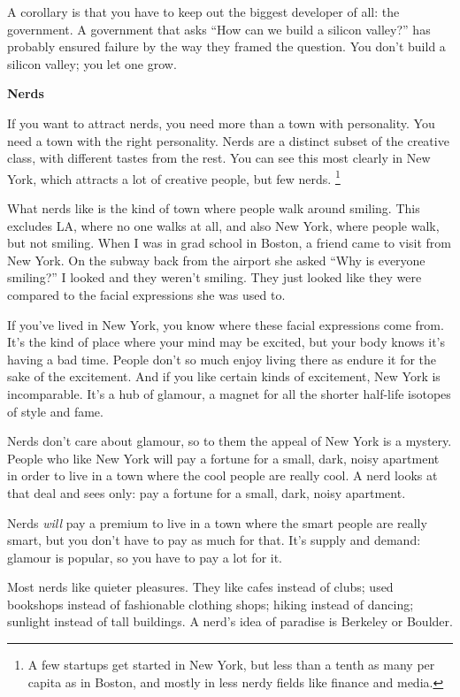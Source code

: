 A corollary is that you have to keep out the biggest developer of all:
the government. A government that asks ``How can we build a silicon
valley?'' has probably ensured failure by the way they framed the
question. You don't build a silicon valley; you let one grow.

\textbf{Nerds}

If you want to attract nerds, you need more than a town with
personality. You need a town with the right personality. Nerds are a
distinct subset of the creative class, with different tastes from the
rest. You can see this most clearly in New York, which attracts a lot of
creative people, but few nerds. \footnote{A few startups get started in New York, but less than a tenth as
many per capita as in Boston, and mostly in less nerdy fields like
finance and media.}

What nerds like is the kind of town where people walk around smiling.
This excludes LA, where no one walks at all, and also New York, where
people walk, but not smiling. When I was in grad school in Boston, a
friend came to visit from New York. On the subway back from the airport
she asked ``Why is everyone smiling?'' I looked and they weren't
smiling. They just looked like they were compared to the facial
expressions she was used to.

If you've lived in New York, you know where these facial expressions
come from. It's the kind of place where your mind may be excited, but
your body knows it's having a bad time. People don't so much enjoy
living there as endure it for the sake of the excitement. And if you
like certain kinds of excitement, New York is incomparable. It's a hub
of glamour, a magnet for all the shorter half-life isotopes of style and
fame.

Nerds don't care about glamour, so to them the appeal of New York is a
mystery. People who like New York will pay a fortune for a small, dark,
noisy apartment in order to live in a town where the cool people are
really cool. A nerd looks at that deal and sees only: pay a fortune for
a small, dark, noisy apartment.

Nerds \emph{will} pay a premium to live in a town where the smart people
are really smart, but you don't have to pay as much for that. It's
supply and demand: glamour is popular, so you have to pay a lot for it.

Most nerds like quieter pleasures. They like cafes instead of clubs;
used bookshops instead of fashionable clothing shops; hiking instead of
dancing; sunlight instead of tall buildings. A nerd's idea of paradise
is Berkeley or Boulder.

